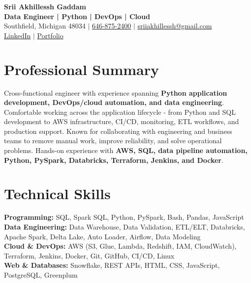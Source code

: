\documentclass[letterpaper,10pt]{article}
\begin{document}
\fontsize{9.35pt}{10.45pt}\selectfont

\begin{center}
    {\LARGE \textbf{Srii Akhillessh Gaddam}} \\[-1pt]
    \textbf{Data Engineer | Python | DevOps | Cloud} \\[2pt]
    Southfield, Michigan 48034 $|$
    \href{tel:6468752400}{646-875-2400} $|$
    \href{mailto:sriiakhillessh@gmail.com}{sriiakhillessh@gmail.com} \\[1pt]
    \href{https://www.linkedin.com/in/srii-akhiilessh-gaddam-b48668191/}{LinkedIn} $|$
    \href{https://sriiakhillesshg.github.io/portfolio/}{Portfolio}
\end{center}
\vspace{-8pt}

\section{Professional Summary}
\small{Cross-functional engineer with experience spanning \textbf{Python application development, DevOps/cloud automation, and data engineering}. Comfortable working across the application lifecycle - from Python and SQL development to AWS infrastructure, CI/CD, monitoring, ETL workflows, and production support. Known for collaborating with engineering and business teams to remove manual work, improve reliability, and solve operational problems. Hands-on experience with \textbf{AWS, SQL, data pipeline automation, Python, PySpark, Databricks, Terraform, Jenkins, and Docker}.}

\section{Technical Skills}
\small{
\textbf{Programming:} SQL, Spark SQL, Python, PySpark, Bash, Pandas, JavaScript \\
\textbf{Data Engineering:} Data Warehouse, Data Validation, ETL/ELT, Databricks, Apache Spark, Delta Lake, Auto Loader, Airflow, Data Modeling \\
\textbf{Cloud \& DevOps:} AWS (S3, Glue, Lambda, Redshift, IAM, CloudWatch), Terraform, Jenkins, Docker, Git, GitHub, CI/CD, Linux \\
\textbf{Web \& Databases:} Snowflake, REST APIs, HTML, CSS, JavaScript, PostgreSQL, Greenplum
}
\end{document}
